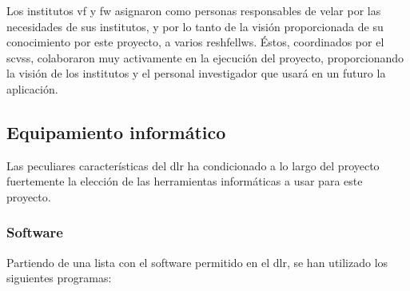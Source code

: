 



\begin{comment}
Relación de las personas (roles) involucradas en el proyecto y de cómo se estructuran
las relaciones entre las mismas para ejecutar el proyecto. Relación de los recursos inventariables
utilizados en el proyecto: equipamiento informático (hardware y software), herramientas empleadas, etc. 
\end{comment}




Los institutos \gls{vf} y \gls{fw} asignaron como personas responsables de velar por las necesidades de sus institutos, y por lo tanto de la visión proporcionada de su conocimiento por este proyecto, a varios \glspl{reshfellw}. Éstos, coordinados por el \gls{scvss}, colaboraron muy activamente en la ejecución del proyecto, proporcionando la visión de los institutos y el personal investigador que usará en un futuro la aplicación.\\

\subsection{Equipamiento informático}
Las peculiares características del \gls{dlr} ha condicionado a lo largo del proyecto fuertemente la elección de las herramientas informáticas a usar para este proyecto.

\subsubsection{Software}
Partiendo de una lista con el \gls{software} permitido en el \gls{dlr}, se han utilizado los siguientes programas:

